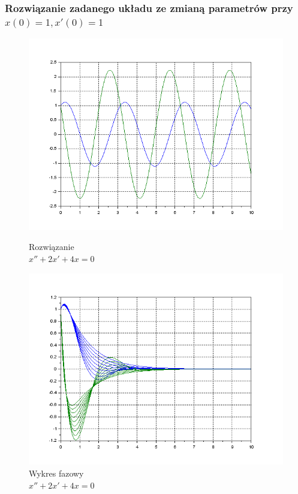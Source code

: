 \documentclass[12pt]{article}
\begin{document}
\subsubsection{Rozwiązanie zadanego układu ze zmianą parametrów przy $x(0)=1, x'(0)=1$}

\begin{figure}[H]
  \centering
  \hspace{-1.6cm}
  \begin{minipage}[b]{0.49\textwidth}
    \includegraphics[scale=0.47]{./img/5-boporu-xy-11}
    \caption{Rozwiązanie \\ \centering $x''+2x'+4x=0$}
  \end{minipage}
  \hfill
  \begin{minipage}[b]{0.49\textwidth}
    \includegraphics[scale=0.47]{./img/5-rowne-xy-11}
    \caption{Wykres fazowy \\
    \centering $x''+2x'+4x=0$}
  \end{minipage}
\end{figure}
\end{document}
